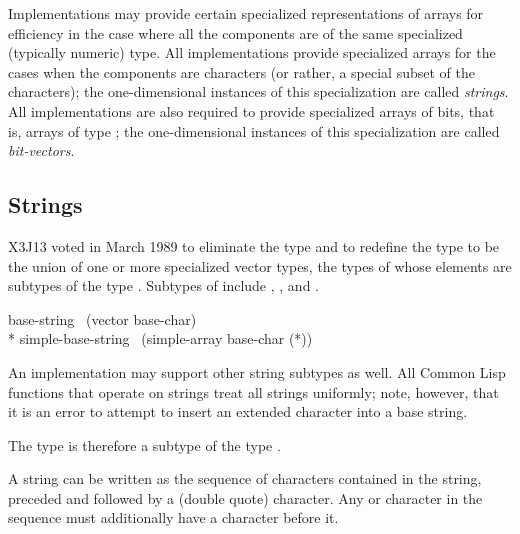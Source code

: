 Implementations may provide certain specialized representations of
arrays for efficiency in the case where all the components are of
the same specialized (typically numeric) type.  All implementations
provide specialized arrays for the cases when the components
are characters (or rather, a special subset of the characters);
the one-dimensional instances of
this specialization are called \emph{strings}.
All implementations are also required to provide specialized arrays
of bits, that is, arrays of type ;
the one-dimensional instances of
this specialization are called \emph{bit-vectors}.

\subsection{Strings}
\label{STRING-TYPE-SECTION}
\begin{newer}
X3J13 voted in March 1989 
to eliminate the type  and to redefine the type
 to be the union of one or more specialized vector
types, the types of whose elements are subtypes of the type .
Subtypes of  include , ,
and .

\vskip 3pt
\begin{lisp}
base-string \EQ\ (vector base-char) \\*
simple-base-string \EQ\ (simple-array base-char (*))
\end{lisp}
An implementation may support
other string subtypes as well.  All Common Lisp functions that operate
on strings treat all strings uniformly; note, however,
that it is an error to attempt to insert
an extended character into a base string.
\end{newer}

\newpage%

The type  is therefore a subtype of the type .

A string can be written as the sequence of characters contained in the
string, preceded and followed by a \cd{{\Xdquote}} (double quote) character.
Any \cd{{\Xdquote}} or \cd{{\Xbackslash}} character in the sequence must additionally
have a \cd{{\Xbackslash}} character before it.


